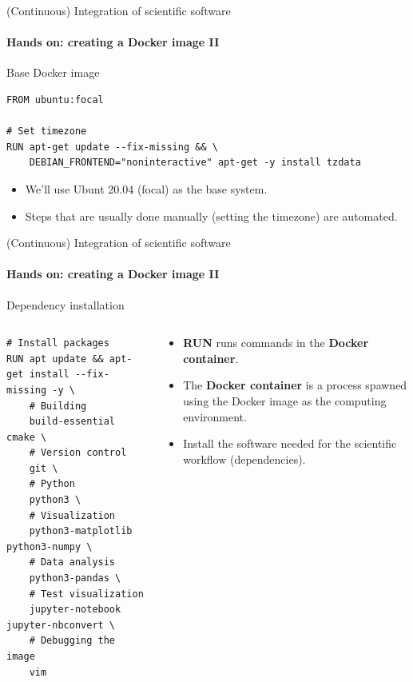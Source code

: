 \begin{frame}[fragile]{(Continuous) Integration of scientific software} 
    \framesubtitle{Hands on: creating a Docker image II} 
    \vfill

    Base Docker image

    \begin{verbatim}
FROM ubuntu:focal 

# Set timezone
RUN apt-get update --fix-missing && \
    DEBIAN_FRONTEND="noninteractive" apt-get -y install tzdata
    \end{verbatim}

    \begin{itemize}
        \item We'll use Ubunt 20.04 (focal) as the base system.
        \item Steps that are usually done manually (setting the timezone) are automated. 
    \end{itemize}

\end{frame}

\begin{frame}[fragile]{(Continuous) Integration of scientific software} 
    \framesubtitle{Hands on: creating a Docker image II} 
    \vfill

    Dependency installation 

    \begin{columns}
        \begin{column}[c]{0.5\textwidth}
    \begin{verbatim}
# Install packages
RUN apt update && apt-get install --fix-missing -y \
    # Building
    build-essential cmake \
    # Version control
    git \
    # Python
    python3 \ 
    # Visualization
    python3-matplotlib python3-numpy \
    # Data analysis
    python3-pandas \
    # Test visualization
    jupyter-notebook jupyter-nbconvert \
    # Debugging the image 
    vim  
    \end{verbatim}
        \end{column}
        \begin{column}[c]{0.5\textwidth}
            \begin{itemize}
                \item \textbf{RUN} runs commands in the \textbf{Docker container}. 
                \item The \textbf{Docker container} is a process spawned using the Docker image as the computing environment.
                \item Install the software needed for the scientific workflow (dependencies).
            \end{itemize}
        \end{column}
    \end{columns}


\end{frame}

